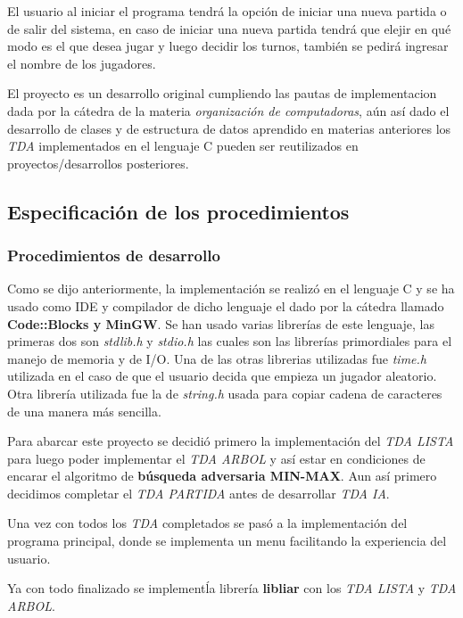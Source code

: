 \documentclass[12pt,a4paper]{article}
\begin{document}
    El usuario al iniciar el programa tendr\'a la opci\'on de iniciar una nueva partida o de salir del sistema, en caso de iniciar una nueva partida tendr\'a que elejir en qu\'e modo es el que desea jugar y luego decidir los turnos, tambi\'en se pedir\'a ingresar el nombre de los jugadores.

    El proyecto es un desarrollo original cumpliendo las pautas de implementacion dada por la c\'atedra de la materia {\itshape organizaci\'on de computadoras}, a\'un as\'i dado el desarrollo de clases y de estructura de datos aprendido en materias anteriores los {\itshape TDA} implementados en el lenguaje C pueden ser reutilizados en proyectos/desarrollos posteriores.

\subsection{Especificaci\'on de los procedimientos}

\subsubsection{Procedimientos de desarrollo}
    Como se dijo anteriormente, la implementaci\'on se realiz\'o en el lenguaje C y se ha usado como IDE y compilador de dicho lenguaje el dado por la c\'atedra llamado {\bf Code::Blocks y MinGW}. Se han usado varias librer\'ias de este lenguaje, las primeras dos son {\itshape stdlib.h} y {\itshape stdio.h} las cuales son las librer\'ias primordiales para el manejo de memoria y de I/O. Una de las otras librerias utilizadas fue {\itshape time.h} utilizada en el caso de que el usuario decida que empieza un jugador aleatorio. Otra librer\'ia utilizada fue la de {\itshape string.h} usada para copiar cadena de caracteres de una manera m\'as sencilla.

    Para abarcar este proyecto se decidi\'o primero la implementaci\'on del {\itshape TDA LISTA} para luego poder implementar el {\itshape TDA ARBOL} y as\'i estar en condiciones de encarar el algoritmo de {\bf b\'usqueda adversaria MIN-MAX}. Aun as\'i primero decidimos completar el {\itshape TDA PARTIDA} antes de desarrollar {\itshape TDA IA}.

    Una vez con todos los {\itshape TDA} completados se pas\'o a la implementaci\'on del programa principal, donde se implementa un menu facilitando la experiencia del usuario.

    Ya con todo finalizado se implement\' la librer\'ia {\bf libliar} con los {\itshape TDA LISTA} y {\itshape TDA ARBOL}.
\end{document}
